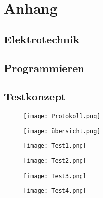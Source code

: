 \section{Anhang} \label{sec:anhang}


\subsection{Elektrotechnik} \label{subsec:eltech}







\subsection{Programmieren} \label{subsec:softech}



\subsection{Testkonzept} \label{subsec:eltech}


\begin{figure}[H]
	\centering
	\texttt{[image: Protokoll.png]}
	\label{fig:Protokoll}
\end{figure}

\begin{figure}[H]
	\centering
	\texttt{[image: übersicht.png]}
	\label{fig:übersicht}
\end{figure}

\begin{figure}[H]
	\centering
	\texttt{[image: Test1.png]}
	\label{fig:Test1}
\end{figure}

\begin{figure}[H]
	\centering
	\texttt{[image: Test2.png]}
	\label{fig:Test2}
\end{figure}

\begin{figure}[H]
	\centering
	\texttt{[image: Test3.png]}
	\label{fig:Test3}
\end{figure}

\begin{figure}[H]
	\centering
	\texttt{[image: Test4.png]}
	\label{fig:Test4}
\end{figure}

